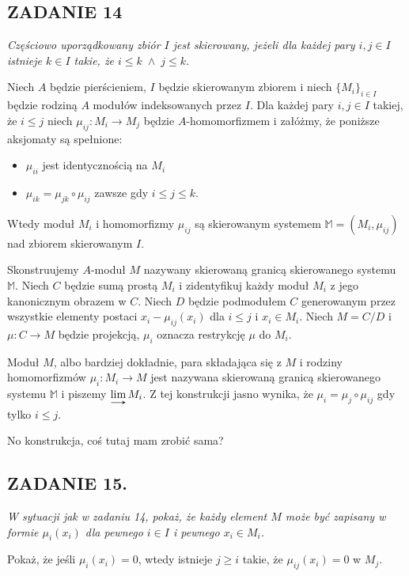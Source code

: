 \documentclass{article}
\begin{document}
\subsection*{ZADANIE 14}
{\slshape\color{yellow}Częściowo uporządkowany zbiór $I$ jest skierowany, jeżeli dla każdej pary $i,j\in I$ istnieje $k\in I$ takie, że $i\leq k\;\land\;j\leq k$.

Niech $A$ będzie pierścieniem, $I$ będzie skierowanym zbiorem i niech $\{M_i\}_{i\in I}$ będzie rodziną $A$ modułów indeksowanych przez $I$. Dla każdej pary $i,j\in I$ takiej, że $i\leq j$ niech $\mu_{ij}:M_i\to M_j$ będzie $A$-homomorfizmem i załóżmy, że poniższe aksjomaty są spełnione:
\begin{itemize}
    \item $\mu_{ii}$ jest identycznością na $M_i$
    \item $\mu_{ik}=\mu_{jk}\circ\mu_{ij}$ zawsze gdy $i\leq j\leq k$.
\end{itemize}
Wtedy moduł $M_i$ i homomorfizmy $\mu_{ij}$ są skierowanym systemem $\mathbb{M}=(M_i,\mu_{ij})$ nad zbiorem skierowanym $I$.

Skonstruujemy $A$-moduł $M$ nazywany skierowaną granicą skierowanego systemu $\mathbb{M}$. Niech $C$ będzie sumą prostą $M_i$ i zidentyfikuj każdy moduł $M_i$ z jego kanonicznym obrazem w $C$. Niech $D$ będzie podmodułem $C$ generowanym przez wszystkie elementy postaci $x_i-\mu_{ij}(x_i)$ dla $i\leq j$ i $x_i\in M_i$. Niech $M=C/D$ i $\mu:C\to M$ będzie projekcją, $\mu_i$ oznacza restrykcję $\mu$ do $M_i$.

Moduł $M$, albo bardziej dokładnie, para składająca się z $M$ i rodziny homomorfizmów $\mu_i:M_i\to M$ jest nazywana skierowaną granicą skierowanego systemu $\mathbb{M}$ i piszemy $\lim\limits_{\tikz[baseline] \draw[-stealth,line width=.4pt] (0ex,0.4ex) -- (3ex,0.4ex);} M_i$. Z tej konstrukcji jasno wynika, że $\mu_i=\mu_j\circ\mu_{ij}$ gdy tylko $i\leq j$.
}

No konstrukcja, coś tutaj mam zrobić sama?

\subsection*{ZADANIE 15.}
{\slshape\color{blue}
W sytuacji jak w zadaniu 14, pokaż, że każdy element $M$ może być zapisany w formie $\mu_i(x_i)$ dla pewnego $i\in I$ i pewnego $x_i\in M_i$.

Pokaż, że jeśli $\mu_i(x_i)=0$, wtedy istnieje $j\geq i$ takie, że $\mu_{ij}(x_i)=0$ w $M_j$.
}
\end{document}
